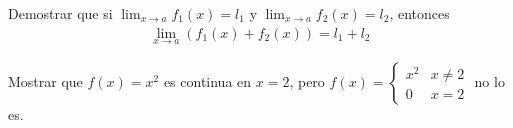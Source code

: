 {}
  \begin{problema}
  Demostrar que si $\lim_{x\to a}f_{1}(x)=l_{1}$ y $\lim_{x\to a}f_{2}(x)=l_{2}$, entonces 
  \begin{align}
   \lim_{x\to a}\left( f_{1}(x)+f_{2}(x) \right)=l_{1}+l_{2}
   \end{align}
  \end{problema}


{}
  \begin{problema}
   Mostrar que $f(x)=x^{2}$ es continua en $x=2$, pero $f(x)= \begin{cases}
x^{2} & x\neq 2 \\
0 & x =2
\end{cases}$ no lo es. 
  \end{problema}


